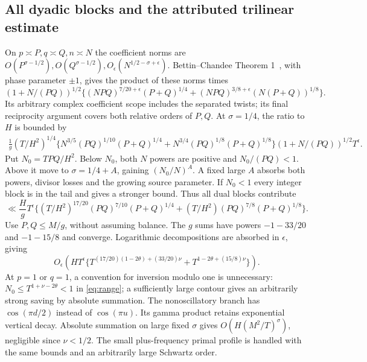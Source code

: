 \documentclass[11pt]{article}
\theoremstyle{remark}
\begin{document}
\subsection{All dyadic blocks and the attributed trilinear estimate}
On $p\asymp P,q\asymp Q,n\asymp N$ the coefficient norms are
$O(P^{\sigma-1/2}),O(Q^{\sigma-1/2}),O_\epsilon(N^{1/2-\sigma+\epsilon})$.
Bettin--Chandee Theorem 1~\cite{BC}, with phase parameter $\pm1$, gives
the product of these norms times
\[
 (1+N/(PQ))^{1/2}
 \{(NPQ)^{7/20+\epsilon}(P+Q)^{1/4}
 +(NPQ)^{3/8+\epsilon}(N(P+Q))^{1/8}\}.
\]
Its arbitrary complex coefficient scope includes the separated twists;
its final reciprocity argument covers both relative orders of $P,Q$.
At $\sigma=1/4$, the ratio to $H$ is bounded by
\begin{align*}
 \frac1g(T/H^2)^{1/4}
 \{N^{3/5}(PQ)^{1/10}(P+Q)^{1/4}
       +N^{3/4}(PQ)^{1/8}(P+Q)^{1/8}\}
 (1+N/(PQ))^{1/2}T^\epsilon.
\end{align*}
Put $N_0=TPQ/H^2$. Below $N_0$, both $N$ powers are positive and
$N_0/(PQ)<1$. Above it move to $\sigma=1/4+A$, gaining $(N_0/N)^A$.
A fixed large $A$ absorbs both powers, divisor losses and the growing
source parameter. If $N_0<1$ every integer block is in the tail and gives
a stronger bound. Thus all dual blocks contribute
\[
 \ll\frac Hg T^\epsilon
 \{(T/H^2)^{17/20}(PQ)^{7/10}(P+Q)^{1/4}
       +(T/H^2)(PQ)^{7/8}(P+Q)^{1/8}\}.
\]
Use $P,Q\le M/g$, without assuming balance. The $g$ sums have powers
$-1-33/20$ and $-1-15/8$ and converge. Logarithmic decompositions are
absorbed in $\epsilon$, giving
\begin{equation}\label{eq:newerror}
 O_\epsilon\left(HT^\epsilon
 \{T^{(17/20)(1-2\theta)+(33/20)\nu}
                  +T^{1-2\theta+(15/8)\nu}\}\right).
\end{equation}
At $p=1$ or $q=1$, a convention for inversion modulo one is unnecessary:
$N_0\le T^{1+\nu-2\theta}<1$ in \eqref{eq:range}; a sufficiently large
contour gives an arbitrarily strong saving by absolute summation.
The nonoscillatory branch has $\cos(\pi d/2)$ instead of $\cos(\pi u)$.
Its gamma product retains exponential vertical decay. Absolute summation
on large fixed $\sigma$ gives $O(H(M^2/T)^\sigma)$, negligible since
$\nu<1/2$. The small plus-frequency primal profile is handled with the
same bounds and an arbitrarily large Schwartz order.
\end{document}
